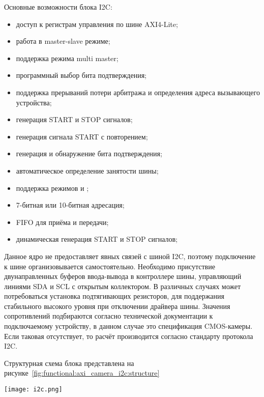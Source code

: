 Основные возможности блока I2C:
\begin{itemize}
  \item доступ к регистрам управления по шине AXI4-Lite;
  \item работа в master-slave режиме;
  \item поддержка режима multi master;
  \item программный выбор бита подтверждения;
  \item поддержка прерываний потери арбитража и определения адреса вызывающего устройства;
  \item генерация START и STOP сигналов;
  \item генерация сигнала START с повторением;
  \item генерация и обнаружение бита подтверждения;
  \item автоматическое определение занятости шины;
  \item поддержка режимов  и ;
  \item 7-битная или 10-битная адресация;
  \item FIFO для приёма и передачи;
  \item динамическая генерация START и STOP сигналов;
\end{itemize}

Данное ядро не предоставляет явных связей с шиной I2C, поэтому подключение к шине организовывается
самостоятельно. Необходимо присутствие двунаправленных буферов ввода-вывода в контроллере шины,
управляющий линиями SDA и SCL с открытым коллектором. В различных случаях может потребоваться
установка подтягивающих резисторов, для поддержания стабильного высокого уровня при отключении
драйвера шины. Значения сопротивлений подбираются согласно технической документации к подключаемому
устройству, в данном случае это спецификация CMOS-камеры. Если таковая отсутствует, то расчёт
производится согласно стандарту протокола I2C.

Структурная схема блока представлена на рисунке~\ref{fig:functional:axi_camera_i2c:structure}

\begin{center}
  \centering
  \texttt{[image: i2c.png]}
  \label{fig:functional:axi_camera_i2c:structure}
\end{center}

